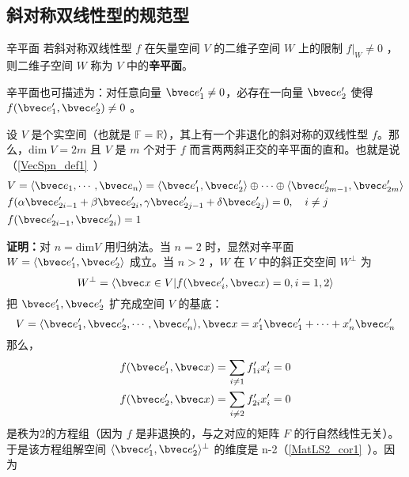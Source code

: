  \subsection{斜对称双线性型的规范型}
 \begin{definition}{辛平面}
 若斜对称双线性型 $f$ 在矢量空间 $V$ 的二维子空间 $W$ 上的限制 $f|_W\neq0$ ，则二维子空间 $W$ 称为 $V$ 中的\textbf{辛平面}。
 \end{definition}
 辛平面也可描述为：对任意向量 $\bvec e'_1\neq0$，必存在一向量 $\bvec e'_2$ 使得 $f(\bvec e'_1,\bvec e'_2)\neq0$ 。
 \begin{theorem}{}
 设 $V$ 是个实空间（也就是 $\mathbb{F}=\mathbb{R}$），其上有一个非退化的斜对称的双线性型 $f$。那么，$\mathrm{dim}\;V=2m$ 且 $V$ 是 $m$ 个对于 $f$ 而言两两斜正交的辛平面的直和。也就是说（\autoref{VecSpn_def1}~）
 \begin{equation}
 \begin{aligned}
 &V=\langle\bvec e_1,\cdots,\bvec e_n\rangle=\langle\bvec e'_1,\bvec e'_2\rangle\oplus\cdots\oplus\langle\bvec e'_{2m-1},\bvec e'_{2m}\rangle\\
&f(\alpha\bvec e'_{2i-1}+\beta\bvec e'_{2i},\gamma\bvec e'_{2j-1}+\delta\bvec e'_{2j})=0,\quad i\neq j\\
 &f(\bvec e'_{2i-1},\bvec e'_{2i})=1
 \end{aligned}
 \end{equation}

 \end{theorem}
\textbf{证明：}对 $n=\mathrm{dim} V$ 用归纳法。当 $n=2$ 时，显然对辛平面 $W=\langle \bvec e'_1,\bvec e'_2\rangle$ 成立。当 $n>2$ ，$W$ 在 $V$ 中的斜正交空间 $W^{\perp}$ 为
\begin{equation}
W^{\perp}=\langle\bvec x\in V|f(\bvec e'_i,\bvec x)=0,i=1,2\rangle
\end{equation}
把 $\bvec e'_1,\bvec e'_2$ 扩充成空间 $V$ 的基底：
\begin{equation}
V=\langle \bvec e'_1,\bvec e'_2,\cdots,\bvec e'_n\rangle, \bvec x=x'_1\bvec e'_1+\cdots+x'_n\bvec e'_n
\end{equation}
那么，
\begin{equation}
\begin{aligned}
&f(\bvec e'_1,\bvec x)=\sum_{i\neq 1}f'_{1i}x'_i=0\\
&f(\bvec e'_2,\bvec x)=\sum_{i\neq 2}f'_{2i}x'_i=0
\end{aligned}
\end{equation}
是秩为2的方程组（因为 $f$ 是非退换的，与之对应的矩阵 $F$ 的行自然线性无关）。于是该方程组解空间 $\langle\bvec e'_1,\bvec e'_2\rangle^{\perp}$ 的维度是 n-2（\autoref{MatLS2_cor1}~）。因为
